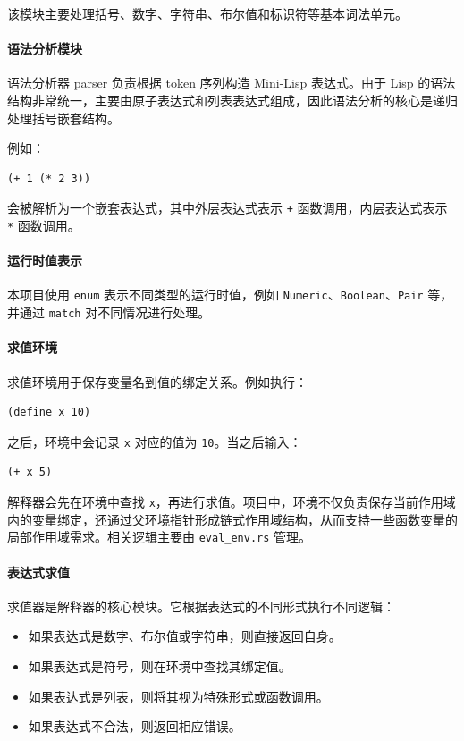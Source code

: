 \documentclass[12pt, a4paper]{ctexart}
\begin{document}
该模块主要处理括号、数字、字符串、布尔值和标识符等基本词法单元。

\paragraph*{语法分析模块}
语法分析器 parser 负责根据 token 序列构造 Mini-Lisp 表达式。由于 Lisp 的语法结构非常统一，主要由原子表达式和列表表达式组成，因此语法分析的核心是递归处理括号嵌套结构。

例如：

\begin{verbatim}
(+ 1 (* 2 3))
\end{verbatim}

会被解析为一个嵌套表达式，其中外层表达式表示 \verb|+| 函数调用，内层表达式表示 \verb|*| 函数调用。

\paragraph*{运行时值表示}
本项目使用 \verb|enum| 表示不同类型的运行时值，例如 \verb|Numeric|、\verb|Boolean|、\verb|Pair| 等，并通过 \verb|match| 对不同情况进行处理。

\paragraph*{求值环境}
求值环境用于保存变量名到值的绑定关系。例如执行：

\begin{verbatim}
(define x 10)
\end{verbatim}

之后，环境中会记录 \verb|x| 对应的值为 \verb|10|。当之后输入：

\begin{verbatim}
(+ x 5)
\end{verbatim}

解释器会先在环境中查找 \verb|x|，再进行求值。项目中，环境不仅负责保存当前作用域内的变量绑定，还通过父环境指针形成链式作用域结构，从而支持一些函数变量的局部作用域需求。相关逻辑主要由 \verb|eval_env.rs| 管理。

\paragraph*{表达式求值}
求值器是解释器的核心模块。它根据表达式的不同形式执行不同逻辑：

\begin{itemize}
\item 如果表达式是数字、布尔值或字符串，则直接返回自身。
\item 如果表达式是符号，则在环境中查找其绑定值。
\item 如果表达式是列表，则将其视为特殊形式或函数调用。
\item 如果表达式不合法，则返回相应错误。
\end{itemize}
\end{document}
